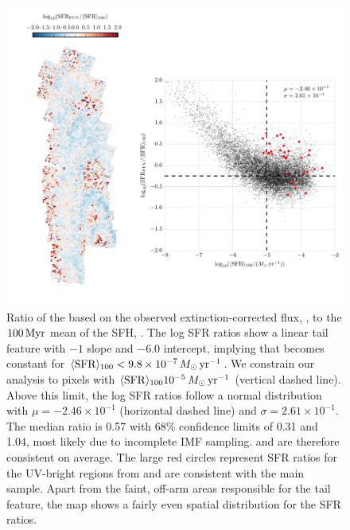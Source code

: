 \documentclass[iop, tighten]{emulateapj}
\begin{document}
\begin{figure}
\centering
\includegraphics[width=\textwidth]{m31flux-figures/sfr_fuv-vs-mean.pdf}
\caption[Ratio of the \sfr{} based on the observed extinction-corrected \fuv{}
flux to the $100\myr$ mean \sfr{}.]{Ratio of the \sfr{} based on the observed
    extinction-corrected \fuv{} flux, \sfrfuv{}, to the $100\myr$ mean of the
    SFH, \sfroneh{}. The log SFR ratios show a linear tail feature with $-1$
    slope and $-6.0$ intercept, implying that \sfrfuv{} becomes constant for
    $\langle\mathrm{SFR}\rangle_{100} < 9.8\times 10^{-7}\,M_\odot\,\mathrm{yr}^{-1}$. We constrain our analysis to
    pixels with $\langle\mathrm{SFR}\rangle_{100}10^{-5}\,M_\odot\,\mathrm{yr}^{-1}$ (vertical dashed line). Above
    this limit, the log SFR ratios follow a normal distribution with $\mu =
    -2.46\times 10^{-1}$ (horizontal dashed line) and $\sigma = 2.61\times
    10^{-1}$. The median ratio is 0.57 with 68\% confidence limits of 0.31 and
    1.04, most likely due to incomplete IMF sampling. \sfrfuv{} and \sfroneh{}
    are therefore consistent on average. The large red circles represent SFR
    ratios for the UV-bright regions from \citet{Simones:2014} and are
    consistent with the main sample. Apart from the faint, off-arm areas
    responsible for the tail feature, the map shows a fairly even spatial
    distribution for the SFR ratios.
}
\label{fig:mfx:fuvsfrratio}
\end{figure}
\end{document}
